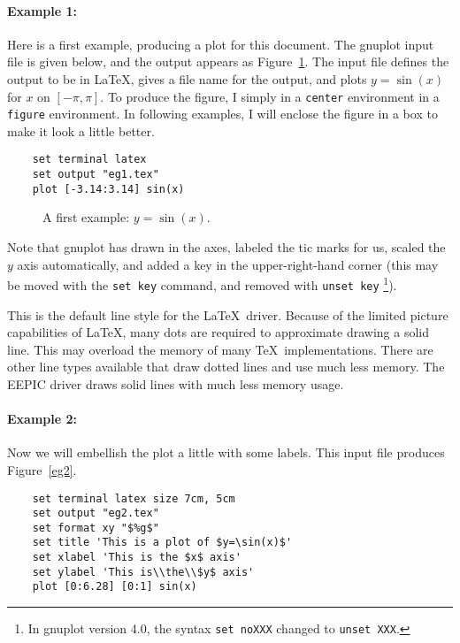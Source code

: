 \paragraph{Example 1:} Here is a first example, producing a plot for
this document. The gnuplot input file is given below, and the output
appears as Figure~\ref{eg1}. The input file defines the output to be
in \LaTeX, gives a file name for the output, and plots $y=\sin(x)$ for
$x$ on $[-\pi,\pi]$. To produce the figure, I simply
\verb++ in a {\tt center} environment in a {\tt figure}
environment. In following examples, I will enclose the figure in a box
to make it look a little better.

\singlespace
\begin{verbatim}
    set terminal latex
    set output "eg1.tex"
    plot [-3.14:3.14] sin(x)
\end{verbatim}
\currentspace

\begin{figure}[htbp]
  \begin{center}
    
  \end{center}
  \caption{A first example: $y=\sin(x)$.}
  \label{eg1}
\end{figure}

Note that gnuplot has drawn in the axes, labeled the tic marks for us,
scaled the $y$ axis automatically, and added a key in the
upper-right-hand corner (this may be moved with the {\tt set key}
command, and removed with {\tt unset key}%
\footnote{In gnuplot version 4.0, the syntax {\tt set noXXX} changed to
{\tt unset XXX}.}).

This is the default line style for the \LaTeX\ driver.  Because of the
limited picture capabilities of \LaTeX, many dots are required to
approximate drawing a solid line. This may overload the memory of many
\TeX\ implementations. There are other line types available that draw
dotted lines and use much less memory. The EEPIC driver draws solid
lines with much less memory usage.

\paragraph{Example 2:} Now we will embellish the plot a little with
some labels.  This input file produces Figure~\ref{eg2}.

\singlespace
\begin{verbatim}
    set terminal latex size 7cm, 5cm
    set output "eg2.tex"
    set format xy "$%g$"
    set title 'This is a plot of $y=\sin(x)$'
    set xlabel 'This is the $x$ axis'
    set ylabel 'This is\\the\\$y$ axis'
    plot [0:6.28] [0:1] sin(x)
\end{verbatim}
\currentspace

